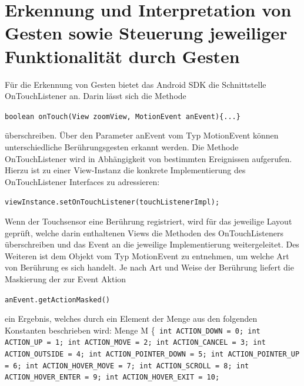 \documentclass[12pt,oneside,a4paper,bibtotoc,liststotoc]{scrreprt}
\begin{document}
\section{Erkennung und Interpretation von Gesten sowie Steuerung jeweiliger Funktionalität durch Gesten}
Für die Erkennung von Gesten bietet das Android SDK die Schnittstelle OnTouchListener an. Darin lässt sich die Methode\newline
   \centerline{ \texttt{boolean onTouch(View zoomView, MotionEvent anEvent)\{...\}}}\newline
überschreiben. Über den Parameter anEvent vom Typ MotionEvent können unterschiedliche Berührungsgesten erkannt werden. Die Methode OnTouchListener wird in Abhängigkeit von bestimmten Ereignissen aufgerufen. Hierzu ist zu einer View-Instanz die konkrete Implementierung des OnTouchListener Interfaces zu adressieren:\newline \centerline{\texttt{viewInstance.setOnTouchListener(touchListenerImpl);}}\newline
Wenn der Touchsensor eine Berührung registriert, wird für das jeweilige Layout geprüft, welche darin enthaltenen Views die Methoden des OnTouchListeners überschreiben und das Event an die jeweilige Implementierung weitergeleitet. Des Weiteren ist dem Objekt vom Typ MotionEvent zu entnehmen, um welche Art von Berührung es sich handelt.
Je nach Art und Weise der Berührung liefert die Maskierung der zur Event Aktion\newline
\centerline{\texttt{anEvent.getActionMasked()}}\newline\newline
ein Ergebnis, welches durch ein Element der Menge aus den folgenden Konstanten beschrieben wird:\newline
Menge M\newline
\{\newline\texttt{
   int ACTION\_DOWN = 0;\newline
   int ACTION\_UP = 1;\newline
   int ACTION\_MOVE = 2;\newline
   int ACTION\_CANCEL = 3;\newline
   int ACTION\_OUTSIDE = 4;\newline
   int ACTION\_POINTER\_DOWN = 5;\newline
   int ACTION\_POINTER\_UP = 6;\newline
   int ACTION\_HOVER\_MOVE = 7;\newline
   int ACTION\_SCROLL = 8;\newline
   int ACTION\_HOVER\_ENTER = 9;\newline
   int ACTION\_HOVER\_EXIT = 10;\newline}
\end{document}
